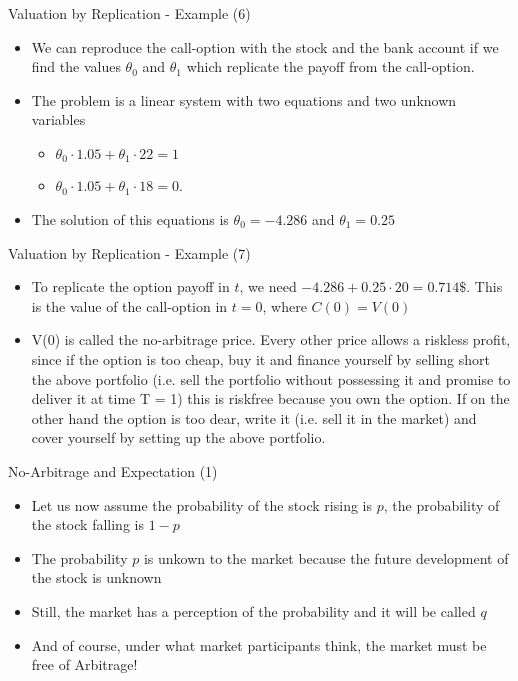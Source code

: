 {Valuation by Replication - Example (6)}
\begin{itemize}
  \item We can reproduce the call-option with the stock and the bank account if we find the values $\theta_0$ and $\theta_1$ which replicate the payoff from the call-option.
  \item The problem is a linear system with two equations and two unknown variables
    \begin{itemize}
    \item $\theta_0 \cdot 1.05 + \theta_1 \cdot 22 = 1$
    \item $\theta_0 \cdot 1.05 + \theta_1 \cdot 18 = 0$.
    \end{itemize}
  \item The solution of this equations is $\theta_0 = -4.286$ and $\theta_1 = 0.25$

\end{itemize}

{Valuation by Replication - Example (7)}
\begin{itemize}
\item To replicate the option payoff in $t$, we need $-4.286+0.25 \cdot 20 = 0.714 \$$. This is the value of the call-option in $t=0$, where $C(0)=V(0)$
\item V(0) is called the no-arbitrage price. Every other price allows a
riskless profit, since if the option is too cheap, buy it and
finance yourself by selling short the above portfolio (i.e. sell the
portfolio without possessing it and promise to deliver it at time
T = 1) this is riskfree because you own the option. If on the
other hand the option is too dear, write it (i.e. sell it in the
market) and cover yourself by setting up the above portfolio.
\end{itemize}

{No-Arbitrage and Expectation (1)}
\begin{itemize}
  \item Let us now assume the probability of the stock rising is $p$, the probability of the stock falling is $1-p$
  \item The probability $p$ is unkown to the market because the future development of the stock is unknown
  \vspace{0.3cm}
  \item Still, the market has a perception of the probability and it will  be called $q$
  \item And of course, under what market participants think, the market must be free of Arbitrage!
\end{itemize}

